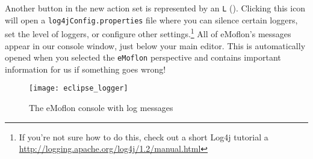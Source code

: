 \begin{stepbystep}
\item
Another button in the new action set is  represented by an \texttt{L} ().
Clicking this icon will open a \texttt{log4jConfig\-.properties} file where you can silence certain loggers, set the level of loggers, or configure other
settings.\footnote{If you're not sure how to do this, check out a short Log4j tutorial a \url{http://logging.apache.org/log4j/1.2/manual.html}} All of eMoflon's
messages appear in our console window, just below your main editor. This is automatically opened when you selected the \texttt{eMoflon} perspective and
contains important information for us if something goes wrong!

\begin{figure}[htbp]
	\centering
  \texttt{[image: eclipse\_logger]}
	\caption{The eMoflon console with log messages}
	\label{eclipse:logger}
\end{figure} 
\end{stepbystep}



